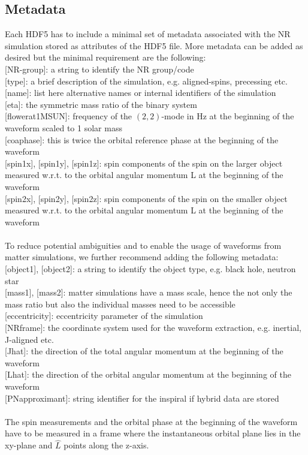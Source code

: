 \documentclass[a4paper, 11pt]{article}
\begin{document}
\subsection{Metadata}
\label{sec:meta}
Each HDF5 has to include a minimal set of metadata associated with the NR simulation stored as attributes of the HDF5 file. 
More metadata can be added as desired but the minimal requirement are the following: \\
\newline
{[}NR-group{]}: a string to identify the NR group/code \\
{[}type{]}: a brief description of the simulation, e.g. aligned-spins, precessing etc. \\
{[}name{]}: list here alternative names or internal identifiers of the simulation \\
{[}eta{]}: the symmetric mass ratio of the binary system \\
{[}f\textunderscore lower\textunderscore at\textunderscore 1MSUN{]}: frequency of the $(2,2)$-mode in Hz at the beginning of the waveform scaled to 1 solar mass \\
{[}coa\textunderscore phase{]}: this is twice the orbital reference phase at the beginning of the waveform \\
{[}spin1x{]}, {[}spin1y{]}, {[}spin1z{]}: spin components of the spin on the larger object measured w.r.t. to the orbital angular momentum L at the beginning of the waveform \\
{[}spin2x{]}, {[}spin2y{]}, {[}spin2z{]}: spin components of the spin on the smaller object measured w.r.t. to the orbital angular momentum L at the beginning of the waveform \\
\\ To reduce potential ambiguities and to enable the usage of waveforms from matter simulations, we further recommend adding the following metadata: \\
{[}object1{]}, {[}object2{]}: a string to identify the object type, e.g. black hole, neutron star \\
{[}mass1{]}, {[}mass2{]}: matter simulations have a mass scale, hence the not only the mass ratio but also the individual masses need to be accessible\\
{[}eccentricity{]}: eccentricity parameter of the simulation\\
{[}NR\textunderscore frame{]}: the coordinate system used for the waveform extraction, e.g. inertial, J-aligned etc. \\
{[}J\textunderscore hat{]}: the direction of the total angular momentum at the beginning of the waveform\\
{[}L\textunderscore hat{]}: the direction of the orbital angular momentum at the beginning of the waveform \\
{[}PN\textunderscore approximant{]}: string identifier for the inspiral if hybrid data are stored \\
\\ The spin measurements and the orbital phase at the beginning of the waveform have to be measured in a frame where the instantaneous orbital plane
lies in the xy-plane and $\hat{L}$ points along the z-axis. 
\end{document}
